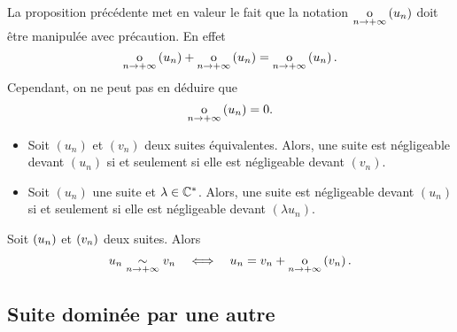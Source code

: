 \documentclass{magnoliaold}
\begin{document}
\begin{remarqueUnique}
\remarque La proposition précédente met en valeur le fait que la notation
  $\underset{n \rightarrow +\infty}{\text{o}}\left(u_n\right)$ doit être manipulée avec précaution. En effet
  \[\underset{n \rightarrow +\infty}{\text{o}}\left(u_n\right) + \underset{n \rightarrow +\infty}{\text{o}}\left(u_n\right) = \underset{n \rightarrow +\infty}{\text{o}}\left(u_n\right).\]
  Cependant, on ne peut pas en déduire que
  \[\underset{n \rightarrow +\infty}{\text{o}}\left(u_n\right)=0.\]
\end{remarqueUnique}

\begin{proposition}[utile=-3]
\begin{itemize}
\item Soit $(u_n)$ et $(v_n)$ deux suites équivalentes. Alors, une suite est négligeable
  devant $(u_n)$ si et seulement si elle est négligeable devant $(v_n)$.
\item Soit $(u_n)$ une suite et $\lambda\in\mathbb{C}^*$. Alors, une suite est négligeable devant
  $(u_n)$ si et seulement si elle est négligeable devant $(\lambda u_n)$.
\end{itemize}
\end{proposition}

\begin{proposition}[utile=-3]
Soit $\left(u_n\right)$ et $\left(v_n\right)$ deux suites. Alors
\[u_n \underset{n\rightarrow +\infty}{\sim} v_n \quad\Longleftrightarrow\quad u_n=v_n+\underset{n \rightarrow +\infty}{\text{o}}\left(v_n\right).\]
\end{proposition}




  
\subsection{Suite dominée par une autre}
\end{document}
